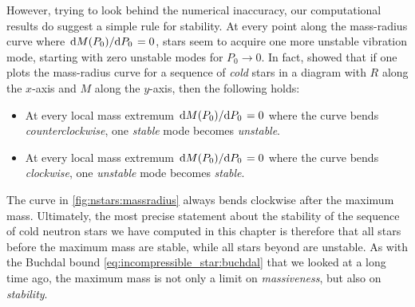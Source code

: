 
However, trying to look behind the numerical inaccuracy, our computational results do suggest a simple rule for stability.
At every point along the mass-radius curve where $\odv{M(P_0)}/{P_0} = 0$, stars seem to acquire one more unstable vibration mode, starting with zero unstable modes for $P_0 \rightarrow 0$.
In fact,  showed that if one plots the mass-radius curve for a sequence of \emph{cold} stars in a diagram with $R$ along the $x$-axis and $M$ along the $y$-axis, then the following holds:
\begin{itemize}
\item At every local mass extremum $\odv{M(P_0)}/{P_0} = 0$ where the curve bends \emph{counterclockwise}, one \emph{stable} mode becomes \emph{unstable}.
\item At every local mass extremum $\odv{M(P_0)}/{P_0} = 0$ where the curve bends \emph{clockwise}, one \emph{unstable} mode becomes \emph{stable}.
\end{itemize}
The curve in \cref{fig:nstars:massradius} always bends clockwise after the maximum mass. 
Ultimately, the most precise statement about the stability of the sequence of cold neutron stars we have computed in this chapter is therefore that all stars before the maximum mass are stable, while all stars beyond are unstable.
As with the Buchdal bound \eqref{eq:incompressible_star:buchdal} that we looked at a long time ago, the maximum mass is not only a limit on \emph{massiveness}, but also on \emph{stability}.

